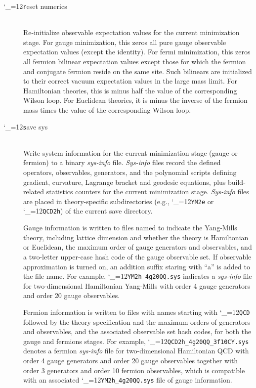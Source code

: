 \documentclass [12pt]{article}
\makeatletter
\renewcommand{\tt}{\begingroup\catcode`_=12\def\_{\string_}\tt@}
\newcommand{\tt@}[1]{\texttt{#1}\endgroup}
\makeatother
\begin{document}
\begin{description}
\item [\tt reset numerics]~\\
    Re-initialize observable expectation values
    for the current minimization stage.
    For gauge minimization, this zeros all pure gauge
    observable expectation values (except the identity).
    For fermi minimization, this zeros all fermion
    bilinear expectation values except those for which
    the fermion and conjugate fermion reside on the same
    site.  Such bilinears are initialized to their
    correct vacuum expectation values in the large mass limit.
    For Hamiltonian theories, this is minus half
    the value of the corresponding Wilson loop.
    For Euclidean theories, it is minus the inverse of the fermion mass
    times the value of the corresponding Wilson loop.

\item [\tt save sys]~\\
    Write system information for the current minimization stage
    (gauge or fermion) to a binary \textit{sys-info} file.
    \textit{Sys-info} files record the defined
    operators, observables, generators, and the polynomial scripts
    defining gradient, curvature, Lagrange bracket and geodesic equations,
    plus build-related statistics counters for the current minimization stage.
    \textit{Sys-info} files are placed in theory-specific subdirectories
    (e.g., \tt{YM2e} or \tt{QCD2h})
    of the current save directory.

    Gauge information is written to files 
    named to indicate the Yang-Mills theory, including lattice dimension and whether
    the theory is Hamiltonian or Euclidean,
    the maximum order of gauge generators and observables, and
    a two-letter upper-case hash code of the gauge observable set.
    If observable approximation is turned on, an addition suffix
    staring with ``a'' is added to the file name.
    For example, \tt{YM2h_4g20QQ.sys} indicates a \textit{sys-info} file for
    two-dimensional Hamiltonian Yang-Mills with order 4 gauge
    generators and order 20 gauge observables.

    Fermion information is written to files with names
    starting with \tt{QCD} followed by the theory specification and
    the maximum orders of generators and observables,
    and the associated observable set hash codes,
    for both the gauge and fermions stages.
    For example, \tt{QCD2h_4g20QQ_3f10CY.sys} denotes a fermion 
    \textit{sys-info} file for two-dimensional Hamiltonian QCD with order 4 gauge
    generators and order 20 gauge observables together with
    order 3 generators and order 10 fermion observables,
    which is compatible with an associated \tt{YM2h_4g20QQ.sys}
    file of gauge information.


\end{description}
\end{document}
